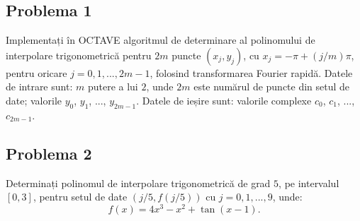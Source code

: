 \documentclass{exam}
\begin{document}
\subsection{Problema 1}
Implementați în OCTAVE algoritmul de determinare al polinomului de interpolare trigonometrică pentru $2m$ puncte ${(x_j, y_j)}$, cu $x_j = -\pi + (j/m)\pi$, pentru oricare $j = 0, 1, ..., 2m-1$, folosind transformarea Fourier rapidă.  Datele de intrare sunt: $m$ putere a lui $2$, unde $2m$ este numărul de puncte din setul de date; valorile $y_0$, $y_1$, ..., $y_{2m-1}$. Datele de ieșire sunt: valorile complexe $c_0$, $c_1$, ..., $c_{2m-1}.$


\subsection{Problema 2}
Determinați polinomul de interpolare trigonometrică de grad $5$, pe intervalul $[0, 3]$, pentru setul de date $(j/5, f(j/5))$ cu $j = 0, 1, ..., 9$, unde:
$$f(x) =  4x^3 - x^2 + \tan (x-1).$$

\end{document}

